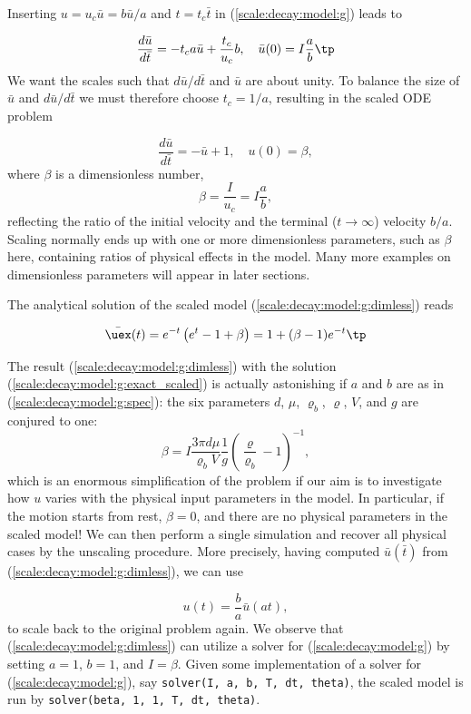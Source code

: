 \documentclass[graybox,envcountchap,sectrefs,final]{svmonodo}
\begin{document}

Inserting $u = u_c\bar u = b\bar u/a$ and $t=t_c\bar t$ in
(\ref{scale:decay:model:g}) leads to

\[
\frac{d\bar u}{d\bar t} = -t_c a\bar u + \frac{t_c}{u_c}b,
\quad \bar u(0) = I\frac{a}{b}
\tp
\]
We want the scales such that $d\bar u/d\bar t$ and $\bar u$ are
about unity.
To balance the size of $\bar u$ and $d\bar u/d\bar t$ we must
therefore choose
$t_c = 1/a$, resulting in the scaled ODE problem

\begin{equation}
\frac{d\bar u}{d\bar t} = -\bar u + 1,\quad u(0)=\beta,
\label{scale:decay:model:g:dimless}
\end{equation}
where $\beta$ is a dimensionless number,
\begin{equation}
\beta = \frac{I}{u_c} = I\frac{a}{b},
\end{equation}
reflecting the ratio of the initial velocity and the
terminal ($t\rightarrow \infty$) velocity $b/a$.
Scaling normally ends up with one or more dimensionless parameters,
such as $\beta$ here, containing ratios of physical effects in
the model. Many more examples on dimensionless parameters will appear
in later sections.

The analytical solution of the scaled model
(\ref{scale:decay:model:g:dimless}) reads

\begin{equation}
\bar\uex(t) =
e^{-t}\left( e^{t}-1 + \beta\right) = 1 + (\beta -1)e^{-t}\tp
\label{scale:decay:model:g:exact_scaled}
\end{equation}

The result (\ref{scale:decay:model:g:dimless}) with the
solution (\ref{scale:decay:model:g:exact_scaled}) is actually
astonishing if $a$ and $b$ are as in (\ref{scale:decay:model:g:spec}):
the six parameters $d$, $\mu$, $\varrho_b$, $\varrho$, $V$, and $g$
are conjured to one:
\[ \beta = I\frac{3\pi d\mu}{\varrho_b V}
\frac{1}{g}\left(\frac{\varrho}{\varrho_b} -1\right)^{-1},
\]
which is an enormous simplification of the problem if our aim is to
investigate how $u$ varies with the physical input parameters in
the model.
In particular, if the motion starts from rest, $\beta=0$, and
there are no physical parameters in the scaled model!
We can then perform a single simulation and recover all physical
cases by the unscaling procedure. More precisely,
having computed $\bar u(\bar t)$ from (\ref{scale:decay:model:g:dimless}),
we can use

\begin{equation}
u(t) = \frac{b}{a}\bar u(at),
\end{equation}
to scale back to the original
problem again.
We observe that (\ref{scale:decay:model:g:dimless}) can utilize a solver
for (\ref{scale:decay:model:g}) by setting $a=1$, $b=1$, and $I=\beta$.
Given some implementation of a solver for (\ref{scale:decay:model:g}),
say \texttt{solver(I, a, b, T, dt, theta)},
the scaled model is run by \texttt{solver(beta, 1, 1, T, dt, theta)}.
\end{document}
